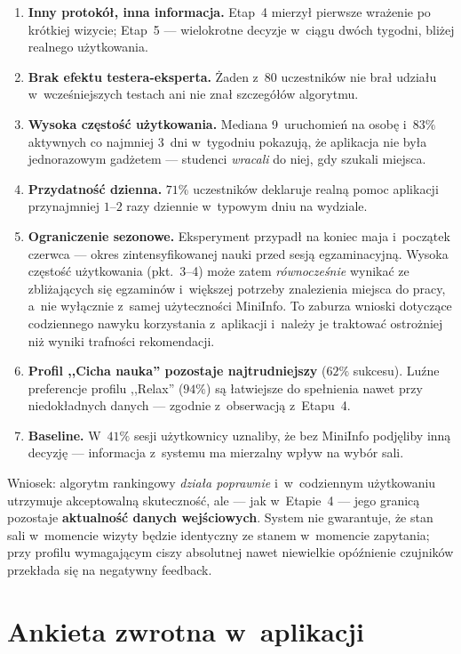\documentclass[14pt,a4paper]{extarticle}
\begin{document}
\begin{enumerate}
    \item \textbf{Inny protokół, inna informacja.} Etap~4 mierzył pierwsze wrażenie po krótkiej wizycie; Etap~5 --- wielokrotne decyzje w~ciągu dwóch tygodni, bliżej realnego użytkowania.
    \item \textbf{Brak efektu testera-eksperta.} Żaden z~$80$ uczestników nie brał udziału w~wcześniejszych testach ani nie znał szczegółów algorytmu.
    \item \textbf{Wysoka częstość użytkowania.} Mediana 9~uruchomień na osobę i~$83\%$ aktywnych co najmniej 3~dni w~tygodniu pokazują, że aplikacja nie była jednorazowym gadżetem --- studenci \emph{wracali} do niej, gdy szukali miejsca.
    \item \textbf{Przydatność dzienna.} $71\%$ uczestników deklaruje realną pomoc aplikacji przynajmniej $1$--$2$ razy dziennie w~typowym dniu na wydziale.
    \item \textbf{Ograniczenie sezonowe.} Eksperyment przypadł na koniec maja i~początek czerwca --- okres zintensyfikowanej nauki przed sesją egzaminacyjną. Wysoka częstość użytkowania (pkt.~3--4) może zatem \emph{równocześnie} wynikać ze zbliżających się egzaminów i~większej potrzeby znalezienia miejsca do pracy, a~nie wyłącznie z~samej użyteczności MiniInfo. To zaburza wnioski dotyczące codziennego nawyku korzystania z~aplikacji i~należy je traktować ostrożniej niż wyniki trafności rekomendacji.
    \item \textbf{Profil ,,Cicha nauka'' pozostaje najtrudniejszy} ($62\%$ sukcesu). Luźne preferencje profilu ,,Relax'' ($94\%$) są łatwiejsze do spełnienia nawet przy niedokładnych danych --- zgodnie z~obserwacją z~Etapu~4.
    \item \textbf{Baseline.} W~$41\%$ sesji użytkownicy uznaliby, że bez MiniInfo podjęliby inną decyzję --- informacja z~systemu ma mierzalny wpływ na wybór sali.
\end{enumerate}

Wniosek: algorytm rankingowy \emph{działa poprawnie} i~w~codziennym użytkowaniu utrzymuje akceptowalną skuteczność, ale --- jak w~Etapie~4 --- jego granicą pozostaje \textbf{aktualność danych wejściowych}. System nie gwarantuje, że stan sali w~momencie wizyty będzie identyczny ze stanem w~momencie zapytania; przy profilu wymagającym ciszy absolutnej nawet niewielkie opóźnienie czujników przekłada się na negatywny feedback.

\section{Ankieta zwrotna w~aplikacji}
\end{document}
